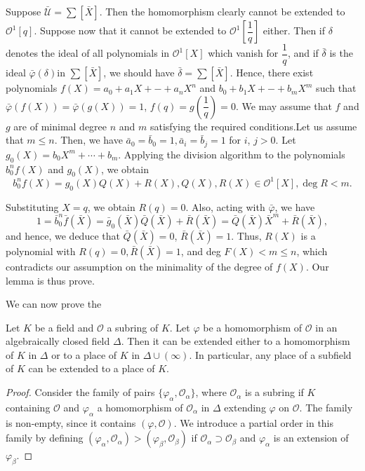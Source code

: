 \begin{Case} %
  Suppose $\bar{\mathscr{U}} = \sum [\bar{X}]$. Then the homomorphism
  clearly cannot be extended to $\mathscr{O}^1 [q]$. Suppose now that
  it cannot be extended to $\mathscr{O}^1 [\dfrac{1}{q}]$ either. Then
  if $\delta$ denotes the ideal of all polynomials in $\mathscr{O}^1
  [X]$ which vanish for $\dfrac{1}{q}$, and if $\bar{\delta}$ is the ideal
  $\bar{\varphi}(\delta) $in $\sum [\bar{X}]$, we should have
  $\bar{\delta} = \sum [\bar{X}]$. Hence, there exist polynomials
  $f(X)=a_0 + 	a_1 X + - + a_n X^n$ and $b_0 + 	b_1 X + - +
  b_m X^m$ such that $\bar{\varphi} (f(X)) = \bar{\varphi}(g(X)) = 1$, $f(q)
  = g \left(\dfrac{1}{q}\right) = 0$. We may assume that $f$ and $g$ are of
  minimal degree $n$ and $m$ satisfying the required conditions.\pageoriginale Let
  us assume that $m \le n$. Then, we have $\bar{a}_0 = \bar{b}_0 = 1,
  \bar{a}_i = \bar{b}_j = 1$ for $i$, $j > 0$. Let $g_0 (X) = b_0 X^m
  + \cdots + b_m$. Applying the division algorithm to the polynomials
  $b_0 ^n f(X)$ and $g_0 (X)$, we obtain  
  $$
  b_0 ^n f(X) = g_0(X) Q(X) + R(X), Q(X), R(X) \in \mathscr{O}^1 [X],
  \deg R < m. 
  $$
\end{Case}

Substituting $X = q$, we obtain $R(q) = 0$. Also, acting with
$\bar{\varphi}$, we have  
$$
1 = \bar{b}_0 ^n \bar{f}(\bar{X}) = \bar{g}_0(\bar{X})
\bar{Q}(\bar{X}) + \bar{R}(\bar{X}) =  \bar{Q}(\bar{X}) \bar{X}^m +
\bar{R}(\bar{X}), 
$$
and hence, we deduce that $\bar{Q}(\bar{X}) = 0$, $\bar{R} (\bar{X}) =
1$. Thus, $R(X)$ is a polynomial with $R(q) = 0, \bar{R}(\bar{X}) =
1$, and deg $F(X) < m \le n$, which contradicts our assumption on the
minimality of the degree of $f(X)$. Our lemma is thus prove. 

We can now prove the 
\begin{theorem*}
  Let $K$ be a field and $\mathscr{O}$ a subring of $K$. Let $\varphi$
  be a homomorphism of $\mathscr{O}$ in an algebraically closed field
  $\Delta$. Then it can be extended either to a homomorphism of $K$ in
  $\Delta$ or to a place of $K$ in $\Delta \cup (\infty)$. In
  particular, any place of a subfield of $K$ can be extended to a
  place of $K$. 
\end{theorem*}

\begin{proof}
  Consider the family of pairs $\{ \varphi_{\alpha},
  \mathscr{O}_{\alpha}\}$, where $\mathscr{O}_{\alpha}$ is a subring
  if $K$ containing $\mathscr{O}$ and $\varphi_{\alpha} $ a homomorphism
  of $\mathscr{O}_{\alpha}$ in $\Delta$ extending $\varphi$ on
  $\mathscr{O}$. The family is non-empty, since it contains $(\varphi
  , \mathscr{O})$. We introduce a partial order in this family by
  defining $(\varphi_{\alpha}, \mathscr{O}_{\alpha}) >
  (\varphi_{\beta}, \mathscr{O}_{\beta})$ if $\mathscr{O}_{\alpha}\supset
  \mathscr{O}_{\beta}$ and $\varphi_{\alpha}$ is an extension of
  $\varphi_{\beta}$. 
\end{proof}

